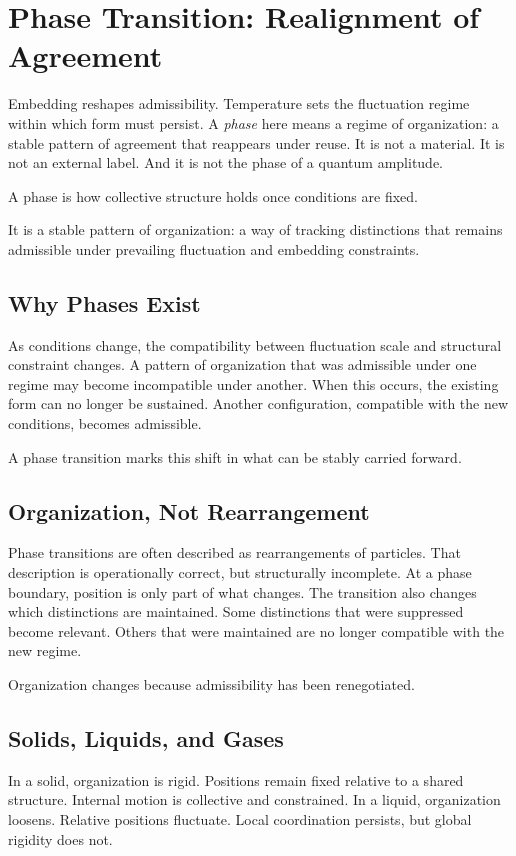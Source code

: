 \documentclass[11pt,twoside,openright]{book}
\begin{document}
\chapter{Phase Transition: Realignment of Agreement}

Embedding reshapes admissibility. Temperature sets the fluctuation regime within which form must persist. A \emph{phase} here means a regime of organization: a stable pattern of agreement that reappears under reuse. It is not a material. It is not an external label. And it is not the phase of a quantum amplitude.

A phase is how collective structure holds once conditions are fixed.

It is a stable pattern of organization:
a way of tracking distinctions
that remains admissible
under prevailing fluctuation and embedding constraints.
\section*{Why Phases Exist}

As conditions change, the compatibility between fluctuation scale and structural constraint changes. A pattern of organization that was admissible under one regime may become incompatible under another. When this occurs, the existing form can no longer be sustained. Another configuration, compatible with the new conditions, becomes admissible.

A phase transition marks this shift
in what can be stably carried forward.
\section*{Organization, Not Rearrangement}

Phase transitions are often described as rearrangements of particles. That description is operationally correct, but structurally incomplete. At a phase boundary, position is only part of what changes. The transition also changes which distinctions are maintained. Some distinctions that were suppressed become relevant. Others that were maintained are no longer compatible with the new regime.

Organization changes
because admissibility has been renegotiated.
\section*{Solids, Liquids, and Gases}

In a solid, organization is rigid. Positions remain fixed relative to a shared structure. Internal motion is collective and constrained. In a liquid, organization loosens. Relative positions fluctuate. Local coordination persists, but global rigidity does not.
\end{document}
